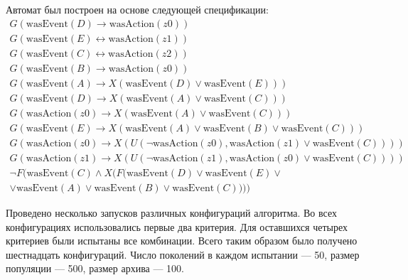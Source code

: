\documentclass[12pt,fleqn]{article}
\begin{document}
Автомат был построен на основе следующей спецификации:
\begin{multline*}
G(\text{wasEvent}(D) \rightarrow \text{wasAction}(z0))\\
G(\text{wasEvent}(E) \leftrightarrow \text{wasAction}(z1))\\
G(\text{wasEvent}(C) \leftrightarrow \text{wasAction}(z2))\\
G(\text{wasEvent}(B) \rightarrow \text{wasAction}(z0))\\
G(\text{wasEvent}(A) \rightarrow X(\text{wasEvent}(D) \vee \text{wasEvent}(E)))\\
G(\text{wasEvent}(D) \rightarrow X(\text{wasEvent}(A) \vee \text{wasEvent}(C)))\\
G(\text{wasAction}(z0) \rightarrow X(\text{wasEvent}(A) \vee \text{wasEvent}(C)))\\
G(\text{wasEvent}(E) \rightarrow X(\text{wasEvent}(A) \vee \text{wasEvent}(B) \vee \text{wasEvent}(C)))\\
G(\text{wasAction}(z0) \rightarrow X(U(\lnot \text{wasAction}(z0), \text{wasAction}(z1) \vee \text{wasEvent}(C))))\\
G(\text{wasAction}(z1) \rightarrow X(U(\lnot \text{wasAction}(z1), \text{wasAction}(z0) \vee \text{wasEvent}(C))))\\
\lnot F(\text{wasEvent}(C) \wedge X(F(\text{wasEvent}(D) \vee \text{wasEvent}(E) \vee \\ \vee \text{wasEvent}(A) \vee \text{wasEvent}(B) \vee \text{wasEvent}(C))))
\end{multline*}

Проведено несколько запусков различных конфигураций алгоритма. Во всех конфигурациях использовались первые два критерия.
Для оставшихся четырех критериев были испытаны все комбинации. Всего таким образом было получено шестнадцать конфигураций.
Число поколений в каждом испытании --- 50, размер популяции --- 500, размер архива --- 100.
\end{document}
